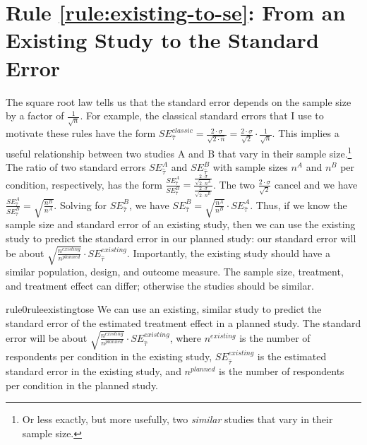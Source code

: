 \documentclass[12pt]{article}
\begin{document}
\section*{Rule \ref{rule:existing-to-se}: From an Existing Study to the Standard Error}

The square root law tells us that the standard error depends on the sample size by a factor of $\frac{1}{\sqrt{n}}$. 
For example, the classical standard errors that I use to motivate these rules have the form $SE_{\widehat{\tau}}^{classic} = \frac{2 \cdot \sigma}{\sqrt{2 \cdot n}} = \frac{2 \cdot \sigma}{\sqrt{2}} \cdot \frac{1}{\sqrt{n}}$.
This implies a useful relationship between two studies A and B that vary in their sample size.\footnote{Or less exactly, but more usefully, two \emph{similar} studies that vary in their sample size.} 
The ratio of two standard errors ${SE}_{\widehat{\tau}}^{A}$ and ${SE}_{\widehat{\tau}}^{B}$ with sample sizes $n^{A}$ and $n^{B}$ per condition, respectively, has the form $\frac{SE_{\widehat{\tau}}^{A}}{SE_{\widehat{\tau}}^{B}} = \frac{\frac{2 \cdot \sigma}{\sqrt{{2 \cdot n}^{A}}}}{\frac{2 \cdot \sigma}{\sqrt{{2 \cdot n}^{B}}}}$.
The two $\frac{2 \cdot \sigma}{\sqrt{2}}$ cancel and we have $\frac{SE_{\widehat{\tau}}^{A}}{SE_{\widehat{\tau}}^{B}} = \sqrt{\frac{n^{B}}{n^{A}}}$.
Solving for $SE_{\widehat{\tau}}^{B}$, we have $SE_{\widehat{\tau}}^{B} = \sqrt{\frac{n^{A}}{n^{B}}} \cdot SE_{\widehat{\tau}}^{A}$.
Thus, if we know the sample size and standard error of an existing study, then we can use the existing study to predict the standard error in our planned study: our standard error will be about $\sqrt{\frac{n^{existing}}{n^{planned}}} \cdot SE_{\widehat{\tau}}^{existing}$.
Importantly, the existing study should have a similar population, design, and outcome measure. 
The sample size, treatment, and treatment effect can differ; otherwise the studies should be similar.

\begin{restatable}{rule0}{ruleexistingtose}
\label{rule:existing-to-se}
We can use an existing, similar study to predict the standard error of the estimated treatment effect in a planned study. The standard error will be about $\sqrt{\frac{n^{existing}}{n^{planned}}} \cdot SE_{\widehat{\tau}}^{existing}$, where $n^{existing}$ is the number of respondents per condition in the existing study, $SE_{\widehat{\tau}}^{existing}$ is the estimated standard error in the existing study, and $n^{planned}$ is the number of respondents per condition in the planned study. 
\end{restatable}
\end{document}
